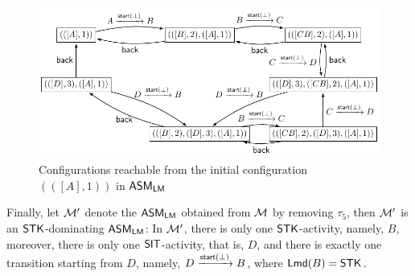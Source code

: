 \begin{example}
		\begin{figure}
			\centering
			\includegraphics[scale = 1]{lmasm-example.pdf}
			\caption{Configurations reachable from the initial configuration $(([A], 1))$ in $\textsf{ASM}_\textsf{LM}$}
			\label{lmasm-example}
		\end{figure}
Finally, let ${\mathcal{M} }'$ denote the $\textsf{ASM}_\textsf{LM}$ obtained from ${\mathcal{M} }$ by removing $\tau_5$, then ${\mathcal{M} }'$ is an $\mathsf{STK}$-dominating $\textsf{ASM}_\textsf{LM}$: In ${\mathcal{M} }'$, there is only one $\mathsf{STK}$-activity, namely, $B$, moreover, there is only one $\mathsf{SIT}$-activity, that is, $D$, and there is exactly one transition starting from $D$, namely, $D \xrightarrow{{\mathsf{start} }(\bot)} B$, where ${\sf Lmd}(B)= {\sf STK}$. 
	\end{example}
	
